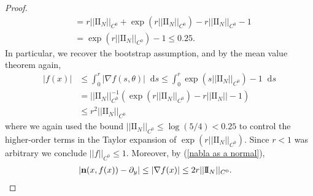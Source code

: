 \documentclass[reqno,11pt]{amsart}
\newcommand*\dif{\mathop{}\!\mathrm{d}}
\newcommand{\Two}{\mathrm{I\!I}}
\newcommand{\normal}{\mathbf n}
\theoremstyle{definition}
\numberwithin{equation}{section}
\begin{document}
\begin{proof}
\begin{align*}
	&= r ||\Two_N||_{C^0} + \exp(r ||\Two_N||_{C^0}) - r ||\Two_N||_{C^0} - 1 \\
	&= \exp(r ||\Two_N||_{C^0}) - 1 \leq 0.25.
\end{align*}
	In particular, we recover the bootstrap assumption, and by the mean value theorem again,
\begin{align*}
	|f(x)| &\leq \int_0^r |\nabla f(s, \theta)| \dif s \leq \int_0^r \exp(s ||\Two_N||_{C^0}) - 1 \dif s \\
	&= ||\Two_N||_{C^0}^{-1} (\exp(r ||\Two_N||_{C^0}) - r||\Two_N|| - 1) \\
	&\leq r^2 ||\Two_N||_{C^0}
\end{align*}
	where we again used the bound $||\Two_N||_{C^0} \leq \log(5/4) < 0.25$ to control the higher-order terms in the Taylor expansion of $\exp(r ||\Two_N||_{C^0})$. Since $r < 1$ was arbitrary we conclude $||f||_{C^0} \leq 1$. Moreover, by (\ref{nabla as a normal}),
\begin{align*}
	|\normal(x, f(x)) - \partial_y| &\leq |\nabla f(x)| \leq 2r ||\Two_N||_{C^0}. \qedhere 
\end{align*}
\end{proof}
\end{document}
